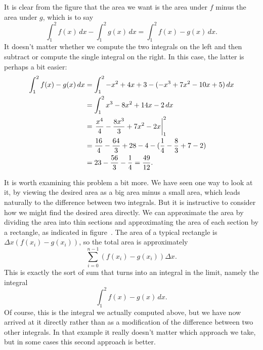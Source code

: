 \begin{example}
It is clear
from the figure that the area we want is the area under $f$ minus the
area under $g$, which is to say
$$\int_1^2 f(x)\,dx-\int_1^2 g(x)\,dx = \int_1^2 f(x)-g(x)\,dx.$$
It doesn't matter whether we compute the two integrals on the left and
then subtract or compute the single integral on the right. In this
case, the latter is perhaps a bit easier:
\begin{align*}
  \int_1^2 f(x)-g(x)\,dx&=\int_1^2 -x^2+4x+3-(-x^3+7x^2-10x+5)\,dx \\
  &=\int_1^2 x^3-8x^2+14x-2\,dx \\
  &=\left.{x^4\over4}-{8x^3\over3}+7x^2-2x\right|_1^2 \\
  &={16\over4}-{64\over3}+28-4-({1\over4}-{8\over3}+7-2) \\
  &=23-{56\over3}-{1\over4}={49\over12}. \\
\end{align*}
\vskip-10pt\end{example}

It is worth examining this problem a bit more. We have seen one way to
look at it, by viewing the desired area as a big area minus a small
area, which leads naturally to the difference between two
integrals. But it is instructive to consider how we might find the
desired area directly. We can approximate the area by dividing the
area into thin sections and approximating the area of each section by
a rectangle, as indicated in 
figure~. 
The area of a typical rectangle is 
$\Delta x(f(x_i)-g(x_i))$, so the total area is approximately
$$\sum_{i=0}^{n-1} (f(x_i)-g(x_i))\Delta x.$$
This is exactly the sort of sum that turns into an integral in the
limit, namely the integral
$$\int_1^2 f(x)-g(x)\,dx.$$
Of course, this is the integral we actually computed above, but we
have now arrived at it directly rather than as a modification of the
difference between two other integrals. In that example it really
doesn't matter which approach we take, but in some cases this second
approach is better.

